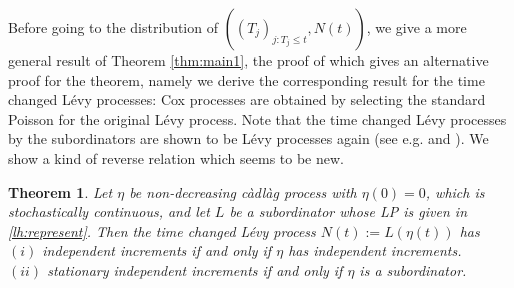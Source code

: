 \documentclass[11pt,leqno%
]{amsart}
\newtheorem{theorem}[lemma]{Theorem}
\newcommand{\1}{{\mathbf 1}}
\begin{document}
Before going to the distribution of
$((T_j)_{j:T_j\le t},N(t))$, we give a more general result of 
Theorem \ref{thm:main1}, the proof of which gives an alternative proof for
the theorem, namely we derive the corresponding result for the time
changed L\'evy processes: Cox processes are obtained by selecting 
the standard Poisson for the original L\'evy process. 
Note that the time changed L\'evy processes by the
subordinators are shown to be L\'evy processes again (see e.g. \cite[Theorem
30.1]{sato:1999} and \cite[Section 4]{bochner:2005}). We show a kind of 
reverse relation which seems to be new.  

\begin{theorem}
\label{thm:general}
 Let $\eta$ be non-decreasing c\`adl\`ag process with $\eta(0)=0$,
 which is stochastically continuous, and let $L$ be a subordinator 
 whose %
 LP is given in \eqref{lh:represent}. %
 Then the time changed L\'evy process $N(t):= L(\eta(t))$ has \\
$(i)$ independent increments if and only if $\eta$ has independent
 increments. \\
$(ii)$ stationary independent increments if and only if $\eta$ is a
 subordinator. 
\end{theorem}
\end{document}
